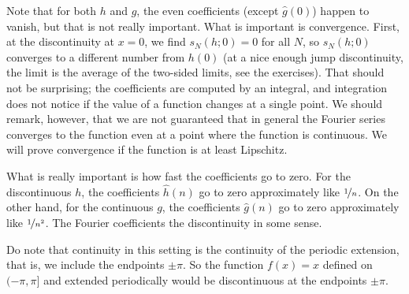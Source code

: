 \begin{example}
\begin{myfigureht}
\caption{The functions $h$ and $g$ in bold, with several
symmetric partial sums in gray.\label{fig:fourierheavicsaw}}
\end{myfigureht}

Note that for both $h$ and $g$, the even coefficients (except $\hat{g}(0)$)
happen to vanish, but that is not really important.
What is important is convergence.
First, at the discontinuity at $x=0$, we find $s_N(h;0) = 0$
for all $N$, so $s_N(h;0)$ converges
to a different number from $h(0)$ (at a nice enough jump discontinuity, the
limit is the average of the two-sided limits, see the exercises).
That should not be surprising;
the coefficients are computed by an integral, and integration
does not notice if the value of a function changes at a single point.
We should remark, however, that we are not guaranteed that in general
the Fourier series converges to the function even at a point where
the function is continuous.
We will prove convergence if the function is at least Lipschitz.

What is really important is how fast the coefficients go to zero.  For the
discontinuous $h$, the coefficients $\hat{h}(n)$ go to zero approximately like
$\nicefrac{1}{n}$.  On the other hand, for the continuous $g$,
the coefficients $\hat{g}(n)$ go to zero approximately like
$\nicefrac{1}{n^2}$.
The Fourier coefficients 
the discontinuity in some sense.

Do note that continuity in this setting is the continuity of the
periodic extension, that is, we include the endpoints $\pm \pi$.
So the function $f(x) = x$ defined on $(-\pi,\pi]$
and extended periodically would be discontinuous at the endpoints $\pm\pi$.
\end{example}

